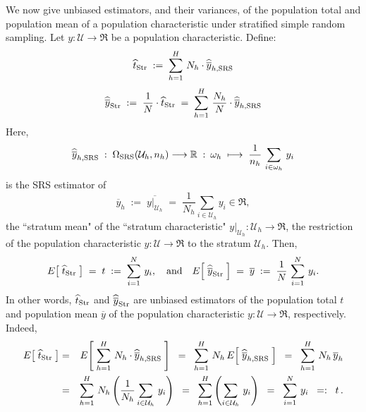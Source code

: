 \documentclass{article}
\begin{document}
We now give unbiased estimators, and their variances, of the population total and population mean of a population characteristic under stratified simple random sampling.  Let $y : \mathcal{U} \longrightarrow \Re$ be a population characteristic.  Define:
\begin{equation*}
    \widehat{t}_{\textnormal{Str}} \; := \; 
    \sum^{H}_{h=1}\, N_{h}\cdot\widehat{\overline{y}}_{h,\textnormal{SRS}}
\end{equation*}
\begin{equation*}
              \widehat{\overline{y}}_{\textnormal{Str}}
    \; := \; \dfrac{1}{N}\cdot\widehat{t}_{\textnormal{Str}}
    \;  = \; \sum^{H}_{h=1}\, \dfrac{N_{h}}{N}\cdot\widehat{\overline{y}}_{h,\textnormal{SRS}}
\end{equation*}
Here,
\begin{equation*}
    \widehat{\overline{y}}_{h,\textnormal{SRS}} \; : \; \Omega_{\textnormal{SRS}}(\mathcal{U}_{h},n_{h}) \longrightarrow \Re
    \; : \: \omega_{h} \; \longmapsto \; \dfrac{1}{n_{h}}\,\sum_{i\in\omega_{h}}\,y_{i}
\end{equation*}
is the SRS estimator of
\begin{equation*}
    \overline{y}_{h} \; := \; \overline{y|_{\mathcal{U}_{h}}} \; = \; \dfrac{1}{N_{h}} \sum_{i\in\mathcal{U}_{h}} y_{i} \in \Re,
\end{equation*}
the ``stratum mean" of the ``stratum characteristic" $y|_{\mathcal{U}_{h}} : \mathcal{U}_{h} \longrightarrow \Re$, the restriction of the population characteristic $y : \mathcal{U} \longrightarrow \Re$ to the stratum $\mathcal{U}_{h}$.  Then,
\begin{equation*}
    E\!\left[\;\widehat{t}_{\textnormal{Str}}\;\right] \; = \; t \; := \; \sum^{N}_{i=1}\,y_{i},
    \quad\textnormal{and}\quad
    E\!\left[\;\widehat{\overline{y}}_{\textnormal{Str}}\;\right] \; = \; \overline{y} \; := \; \dfrac{1}{N}\,\sum^{N}_{i=1}\,y_{i}.
\end{equation*}
In other words, $\widehat{t}_{\textnormal{Str}}$ and $\widehat{\overline{y}}_{\textnormal{Str}}$ are unbiased estimators of the population total $t$ and population mean $\overline{y}$ of the population characteristic $y : \mathcal{U} \longrightarrow \Re$, respectively.  Indeed,
\begin{eqnarray*}
            E\!\left[\;\widehat{t}_{\textnormal{Str}}\;\right]
    &=&  E\!\left[\; \sum^{H}_{h=1}\, N_{h}\cdot\widehat{\overline{y}}_{h,\textnormal{SRS}} \;\right]
    \;\;=\;\;  \sum^{H}_{h=1}\, N_{h}\,E\!\left[\; \widehat{\overline{y}}_{h,\textnormal{SRS}} \;\right]
    \;\;=\;\;  \sum^{H}_{h=1}\, N_{h}\,\overline{y}_{h} \\
    &=& \sum^{H}_{h=1}\, N_{h}\left(\dfrac{1}{N_{h}}\sum_{i\in\mathcal{U}_{h}}\,y_{i}\right)
    \;\;=\;\;  \sum^{H}_{h=1}   \left(\sum_{i\in\mathcal{U}_{h}}\,y_{i}\right)
    \;\;=\;\;  \sum^{N}_{i=1}\,y_{i}
    \;\;=:\;\; t\,.
\end{eqnarray*}
\end{document}
